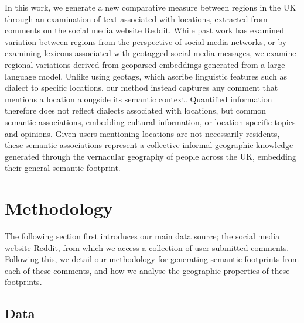 \documentclass[
]{article}
\begin{document}
In this work, we generate a new comparative measure between regions in
the UK through an examination of text associated with locations,
extracted from comments on the social media website Reddit. While past
work has examined variation between regions from the perspective of
social media networks, or by examining lexicons associated with
geotagged social media messages, we examine regional variations derived
from geoparsed embeddings generated from a large language model. Unlike
using geotags, which ascribe linguistic features such as dialect to
specific locations, our method instead captures any comment that
mentions a location alongside its semantic context. Quantified
information therefore does not reflect dialects associated with
locations, but common semantic associations, embedding cultural
information, or location-specific topics and opinions. Given users
mentioning locations are not necessarily residents, these semantic
associations represent a collective informal geographic knowledge
generated through the vernacular geography of people across the UK,
embedding their general semantic footprint.

\section{Methodology}\label{sec-methodology}

The following section first introduces our main data source; the social
media website Reddit, from which we access a collection of
user-submitted comments. Following this, we detail our methodology for
generating semantic footprints from each of these comments, and how we
analyse the geographic properties of these footprints.

\subsection{Data}\label{data}
\end{document}
